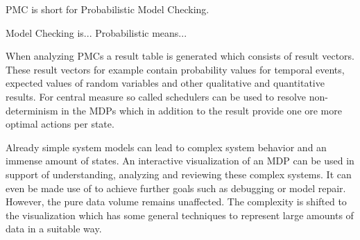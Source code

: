 \documentclass[preview]{standalone}
\begin{document}
%	



PMC is short for Probabilistic Model Checking.

Model Checking is...
Probabilistic means...

When analyzing PMCs a result table is generated which consists of result vectors. These result vectors for example contain probability values for temporal events, expected values of random variables and other qualitative and quantitative results. For central measure so called schedulers can be used to resolve non-determinism in the MDPs which in addition to the result provide one ore more optimal actions per state.

Already simple system models can lead to complex system behavior and an immense amount of states. An interactive visualization of an MDP can be used in support of understanding, analyzing and reviewing these complex systems. It can even be made use of to achieve further goals such as debugging or model repair. However, the pure data volume remains unaffected. The complexity is shifted to the visualization which has some general techniques to represent large amounts of data in a suitable way.
\end{document}
